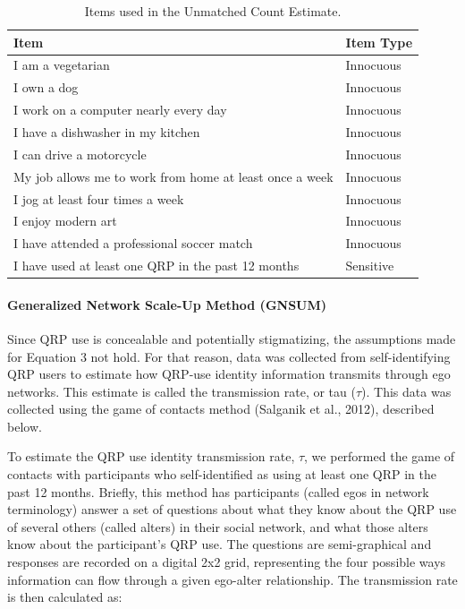 \documentclass[jou]{apa6}
\let\oldparagraph\paragraph
\renewcommand{\paragraph}[1]{\oldparagraph{#1}\mbox{}}
\theoremstyle{definition}
\theoremstyle{definition}
\theoremstyle{definition}
\theoremstyle{remark}
\begin{document}
\begin{table}

\caption{\label{tab:UCT}Items used in the Unmatched Count Estimate.}
\centering
\fontsize{9}{11}\selectfont
\begin{tabular}[t]{>{\raggedright\arraybackslash}p{6.3cm}l}
\toprule
Item & Item Type\\
\midrule
I am a vegetarian & Innocuous\\
I own a dog & Innocuous\\
I work on a computer nearly every day & Innocuous\\
I have a dishwasher in my kitchen & Innocuous\\
I can drive a motorcycle & Innocuous\\
\addlinespace
My job allows me to work from home at least once a week & Innocuous\\
I jog at least four times a week & Innocuous\\
I enjoy modern art & Innocuous\\
I have attended a professional soccer match & Innocuous\\
I have used at least one QRP in the past 12 months & Sensitive\\
\bottomrule
\end{tabular}
\end{table}

\paragraph{Generalized Network Scale-Up Method
(GNSUM)}\label{generalized-network-scale-up-method-gnsum}

Since QRP use is concealable and potentially stigmatizing, the
assumptions made for Equation 3 not hold. For that reason, data was
collected from self-identifying QRP users to estimate how QRP-use
identity information transmits through ego networks. This estimate is
called the transmission rate, or tau (\(\tau\)). This data was collected
using the game of contacts method (Salganik et al., 2012), described
below.

To estimate the QRP use identity transmission rate, \(\tau\), we
performed the game of contacts with participants who self-identified as
using at least one QRP in the past 12 months. Briefly, this method has
participants (called egos in network terminology) answer a set of
questions about what they know about the QRP use of several others
(called alters) in their social network, and what those alters know
about the participant's QRP use. The questions are semi-graphical and
responses are recorded on a digital 2x2 grid, representing the four
possible ways information can flow through a given ego-alter
relationship. The transmission rate is then calculated as:
\end{document}
